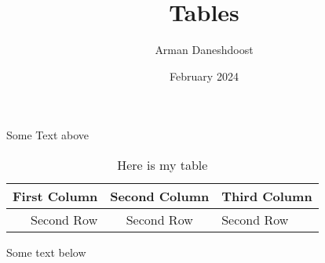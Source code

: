 \documentclass{article}
\title{Tables}
\author{Arman Daneshdoost}
\date{February 2024}
\begin{document}
	\maketitle
	Some Text above
	\begin{table}[h] %
		\centering %
	\begin{tabular}{|r| c |l|} %
		\hline
		First Column & Second Column & Third Column\\ \hline\hline %
		Second Row & Second Row & Second Row
	\end{tabular}
	\caption{Here is my table}
	\end{table}
	Some text below
\end{document}
